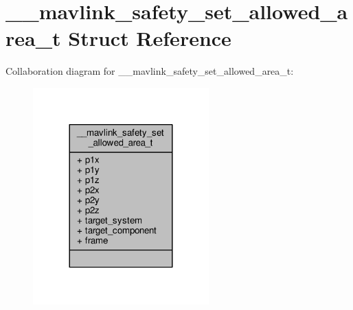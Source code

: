 \hypertarget{struct____mavlink__safety__set__allowed__area__t}{\section{\+\_\+\+\_\+mavlink\+\_\+safety\+\_\+set\+\_\+allowed\+\_\+area\+\_\+t Struct Reference}
\label{struct____mavlink__safety__set__allowed__area__t}
}


Collaboration diagram for \+\_\+\+\_\+mavlink\+\_\+safety\+\_\+set\+\_\+allowed\+\_\+area\+\_\+t\+:
\nopagebreak
\begin{figure}[H]
\begin{center}
\leavevmode
\includegraphics[width=192pt]{struct____mavlink__safety__set__allowed__area__t__coll__graph}
\end{center}
\end{figure}
